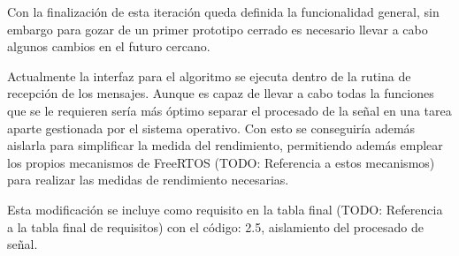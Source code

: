        Con la finalización de esta iteración queda definida la funcionalidad general, sin embargo para gozar de un primer prototipo cerrado es necesario llevar a cabo algunos cambios en el futuro cercano.
        
        Actualmente la interfaz para el algoritmo se ejecuta dentro de la rutina de recepción de los mensajes. Aunque es capaz de llevar a cabo todas la funciones que se le requieren sería más óptimo separar el procesado de la señal en una tarea aparte gestionada por el sistema operativo. Con esto se conseguiría además aislarla para simplificar la medida del rendimiento, permitiendo además emplear los propios mecanismos de FreeRTOS (TODO: Referencia a estos mecanismos) para realizar las medidas de rendimiento necesarias.
        
        Esta modificación se incluye como requisito en la tabla final (TODO: Referencia a la tabla final de requisitos) con el código: 2.5, aislamiento del procesado de señal.